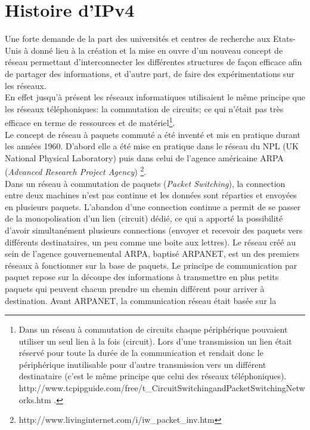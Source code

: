 \section{Histoire d'IPv4}
\label{sec:hist}

Une forte demande de la part des universités et centres de recherche aux
Etats-Unis à donné lieu à la création et la mise en ouvre d'un nouveau concept
de réseau permettant d'interconnecter les différentes structures de façon
efficace afin de partager des informations, et d'autre part, de faire des
expérimentations sur les réseaux.
\\
En effet jusqu'à présent les réseaux informatiques utilisaient le même principe que les
réseaux téléphoniques: la commutation de circuits; ce qui n'était pas très 
efficace en terme de ressources et de matériel\footnote {
Dans un réseau à commutation de circuits chaque périphérique pouvaient utiliser
un seul lien à la fois (circuit). Lors d'une transmission un lien était réservé
pour toute la durée de la communication et rendait donc le périphérique
inutilisable pour d'autre transmission vers un différent destinataire (c'est le même
principe que celui des réseaux téléphoniques).
http://www.tcpipguide.com/free/t\_CircuitSwitchingandPacketSwitchingNetworks.htm .}.
\\
Le concept de réseau à paquets commuté a été inventé et mis en 
pratique durant les années 1960. D'abord elle a été mise en pratique dans le réseau du NPL (UK National Physical Laboratory)
puis dans celui de l'agence américaine ARPA ({\it Advanced Research Project Agency})
\footnote {http://www.livinginternet.com/i/iw\_packet\_inv.htm}.
\\
Dans un réseau à commutation de paquets ({\it Packet Switching}), la connection
entre deux machines n'est pas continue et les données sont réparties et
envoyées en plusieurs paquets.  L'abandon d'une connection continue a permit de
se passer de la monopolisation d'un lien (circuit) dédié, ce qui a apporté la
possibilité d'avoir simultanément plusieurs connections (envoyer et recevoir
des paquets vers différents destinataires, un peu comme une boite aux lettres). 
\smallbreak
Le réseau créé au sein de l'agence gouvernemental ARPA, baptisé ARPANET, est un
des premiers réseaux à fonctionner sur la base de paquets. Le principe de
communication par paquet repose sur la découpe des informations à transmettre en plus
petits paquets qui peuvent chacun prendre un chemin différent pour arriver à
destination.  Avant ARPANET, la communication réseau était basée sur la
